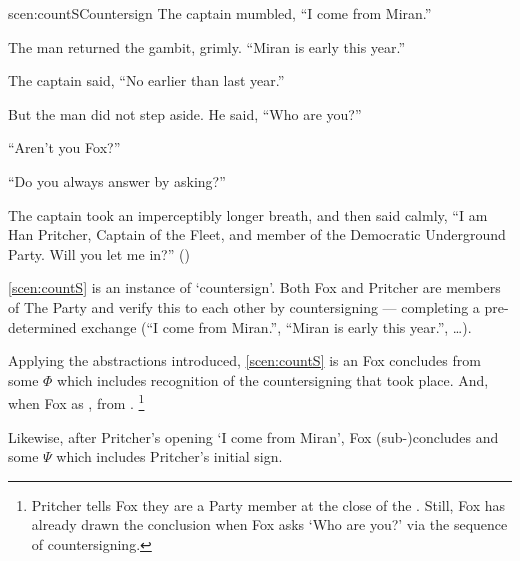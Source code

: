 \begin{note}
  \begin{rscenario}{scen:countS}{Countersign}%
    \indent The captain mumbled, ``I come from Miran.''

    The man returned the gambit, grimly.
    ``Miran is early this year.''

    The captain said, ``No earlier than last year.''

    But the man did not step aside.
    He said, ``Who are you?''

    ``Aren't you Fox?''

    ``Do you always answer by asking?''

    The captain took an imperceptibly longer breath, and then said calmly,
    ``I am Han Pritcher, Captain of the Fleet, and member of the Democratic Underground Party.
    Will you let me in?''%
    \mbox{}\hfill\mbox{(\cite[70]{Asimov:1945aa})}%
    \newline
  \end{rscenario}

  \noindent%
  \autoref{scen:countS} is an instance of `countersign'.
  Both Fox and Pritcher are members of The Party and verify this to each other by countersigning --- completing a pre-determined exchange (``I come from Miran.'', ``Miran is early this year.'', \dots).

  \noindent%
  Applying the abstractions introduced, \autoref{scen:countS} is an \eiw{} Fox concludes  from some \pool{} \(\Phi\) which includes recognition of the countersigning that took place.
  And, when Fox \evals{} \propI{\signConA{}} as ,  from .%
  \footnote{
    Pritcher tells Fox they are a Party member at the close of the \scen{}.
    Still, Fox has already drawn the conclusion when Fox asks `Who are you?' via the sequence of countersigning.
  }

  Likewise, after Pritcher's opening `I come from Miran', Fox (sub-)concludes  and some \pool{} \(\Psi\) which includes Pritcher's initial sign.
\end{note}


